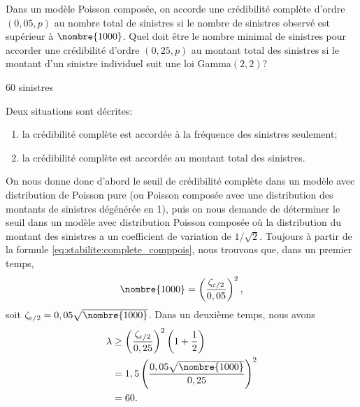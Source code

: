 \begin{exercice}
  Dans un modèle Poisson composée, on accorde une crédibilité complète
  d'ordre $(0,05, p)$ au nombre total de sinistres si le nombre de
  sinistres observé est supérieur à $\nombre{1000}$. Quel doit être le
  nombre minimal de sinistres pour accorder une crédibilité d'ordre
  $(0,25, p)$ au montant total des sinistres si le montant d'un
  sinistre individuel suit une loi Gamma$(2, 2)$?
  \begin{rep}
    60 sinistres
  \end{rep}
  \begin{sol}
    Deux situations sont décrites:
    \begin{enumerate}[1)]
    \item la crédibilité complète est accordée à la fréquence des
      sinistres seulement;
    \item la crédibilité complète est accordée au montant total des
      sinistres.
    \end{enumerate}
    On nous donne donc d'abord le seuil de crédibilité complète dans
    un modèle avec distribution de Poisson pure (ou Poisson composée
    avec une distribution des montants de sinistres dégénérée en 1),
    puis on nous demande de déterminer le seuil dans un modèle avec
    distribution Poisson composée où la distribution du montant des
    sinistres a un coefficient de variation de $1/\sqrt{2}$. Toujours
    à partir de la formule \eqref{eq:stabilite:complete_comppois},
    nous trouvons que, dans un premier temps,
    \begin{displaymath}
      \nombre{1000} =
      \left(
        \frac{\zeta_{\varepsilon/2}}{0,05}
      \right)^2,
    \end{displaymath}
    soit $\zeta_{\varepsilon/2} = 0,05 \sqrt{\nombre{1000}}$. Dans un
    deuxième temps, nous avons
    \begin{align*}
      \lambda
      &\geq
      \left(
        \frac{\zeta_{\varepsilon/2}}{0,25}
      \right)^2
      \left(
        1 + \frac{1}{2}
      \right) \\
      &= 1,5
      \left(
        \frac{0,05 \sqrt{\nombre{1000}}}{0,25}
      \right)^2 \\
      &= 60.
    \end{align*}
  \end{sol}
\end{exercice}

